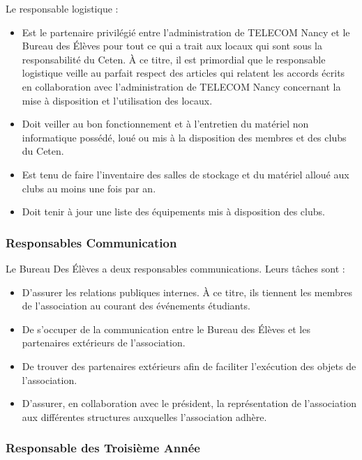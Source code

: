 \documentclass{article} %
\begin{document}
				Le responsable logistique :
				\begin{itemize}
					\item Est le partenaire privilégié entre l’administration de
						TELECOM Nancy et le Bureau des Élèves pour tout ce qui a
						trait aux locaux qui sont sous la responsabilité du
						Ceten. À ce titre, il est primordial que le responsable
						logistique veille au parfait respect des articles qui
						relatent les accords écrits en collaboration avec
						l’administration de TELECOM Nancy concernant la mise à
						disposition et l’utilisation des locaux.
					\item Doit veiller au bon fonctionnement et à l’entretien du
						matériel non informatique possédé, loué ou mis à la
						disposition des membres et des clubs du Ceten.
					\item Est tenu de faire l’inventaire des salles de stockage
						et du matériel alloué aux clubs au moins une fois par
						an.
					\item Doit tenir à jour une liste des équipements mis à
						disposition des clubs.
				\end{itemize}

			\subsubsection{Responsables Communication}

				Le Bureau Des Élèves a deux responsables communications. Leurs
				tâches sont :
				\begin{itemize}
					\item D’assurer les relations publiques internes. À ce
						titre, ils tiennent les membres de l’association au
						courant des événements étudiants.
					\item De s’occuper de la communication entre le Bureau des
						Élèves et les partenaires extérieurs de l’association.
					\item De trouver des partenaires extérieurs afin de
						faciliter l’exécution des objets de l’association.
					\item D’assurer, en collaboration avec le président, la
						représentation de l’association aux différentes
						structures auxquelles l’association adhère. 
				\end{itemize}

			\subsubsection{Responsable des Troisième Année}
\end{document}
